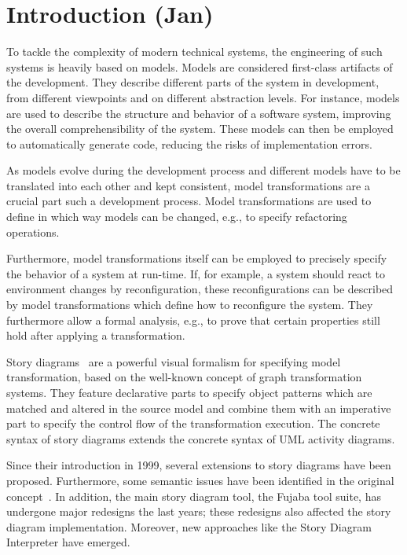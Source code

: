 \chapter{Introduction (Jan)}
To tackle the complexity of modern technical systems, the engineering of such systems is heavily based on models.
Models are considered first-class artifacts of the development.
They describe different parts of the system in development, from different viewpoints and on different abstraction levels.
For instance, models are used to describe the structure and behavior of a software system, improving the overall comprehensibility of the system.
These models can then be employed to automatically generate code, reducing the risks of implementation errors.

As models evolve during the development process and different models have to be translated into each other and kept consistent, model transformations are a crucial part such a development process.
Model transformations are used to define in which way models can be changed, e.g., to specify refactoring operations.

Furthermore, model transformations itself can be employed to precisely specify the behavior of a system at run-time.
If, for example, a system should react to environment changes by reconfiguration, these reconfigurations can be described by model transformations which define how to reconfigure the system.
They furthermore allow a formal analysis, e.g., to prove that certain properties still hold after applying a transformation.

Story diagrams~\cite{ZSW99,FNTZ00,Zun01} are a powerful visual formalism for specifying model transformation, based on the well-known concept of graph transformation systems.
They feature declarative parts to specify object patterns which are matched and altered in the source model and combine them with an imperative part to specify the control flow of the transformation execution.
The concrete syntax of story diagrams extends the concrete syntax of UML activity diagrams.

Since their introduction in 1999, several extensions to story diagrams have been proposed.
Furthermore, some semantic issues have been identified in the original concept~\cite{TMG06}.
In addition, the main story diagram tool, the Fujaba tool suite, has undergone major redesigns the last years; these redesigns also affected the story diagram implementation.
Moreover, new approaches like the Story Diagram Interpreter have emerged.

